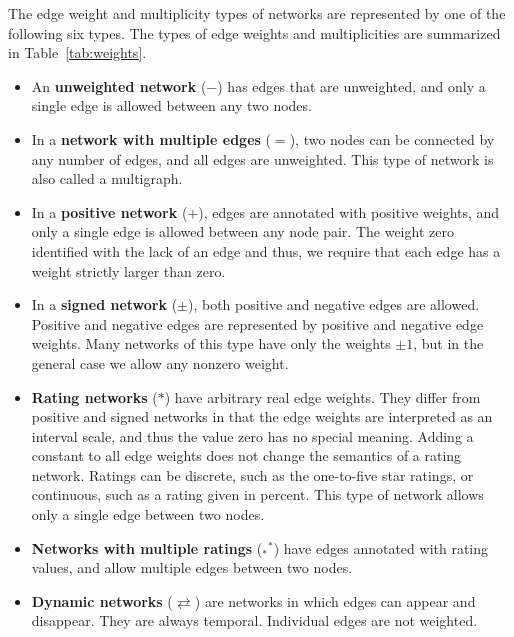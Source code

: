 \documentclass{article}
\begin{document}
The edge weight and multiplicity types of networks are represented by
one of the following six types. 
The types of edge weights and multiplicities are summarized in
Table~\ref{tab:weights}. 
\begin{itemize}
\item An \textbf{unweighted network} ($-$) 
  has edges that are
  unweighted, and only a 
  single edge is allowed between any two nodes.  
\item In a \textbf{network with multiple edges} ($=$), 
  two nodes can be
  connected by any number of edges, and all edges are unweighted. This
  type of network is also called a multigraph.  
\item In a \textbf{positive network} ($+$), 
  edges are annotated
  with positive weights, and only a single edge is allowed between
  any node pair.  The weight zero identified with the lack of an edge
  and thus, we require that each edge has a weight strictly larger than
  zero. 
\item In a \textbf{signed network} ($\pm$), 
  both positive and negative
  edges are 
  allowed. Positive and negative edges are represented by positive and
  negative edge weights. Many networks of this type have only the
  weights $\pm 1$, but in the general case we allow any nonzero weight.
\item \textbf{Rating networks} ($*$) 
  have arbitrary real edge weights.  They
  differ from positive and signed networks in that the edge weights are
  interpreted as an interval scale, and thus the value zero has no
  special meaning.  Adding a constant to all edge weights does not
  change the semantics of a rating network. 
  Ratings can be discrete, such as the one-to-five star ratings, or
  continuous, such as a rating given in percent. 
  This type of network allows only a single edge between two nodes. 
\item \textbf{Networks with multiple ratings} ($_*{}^*$) 
  have edges annotated
  with rating values, and allow multiple edges between two nodes.
\item \textbf{Dynamic networks} ($\rightleftarrows$) are networks in
  which edges can appear and disappear.  They are always
  temporal. Individual edges are not weighted. 
\end{itemize}
\end{document}
